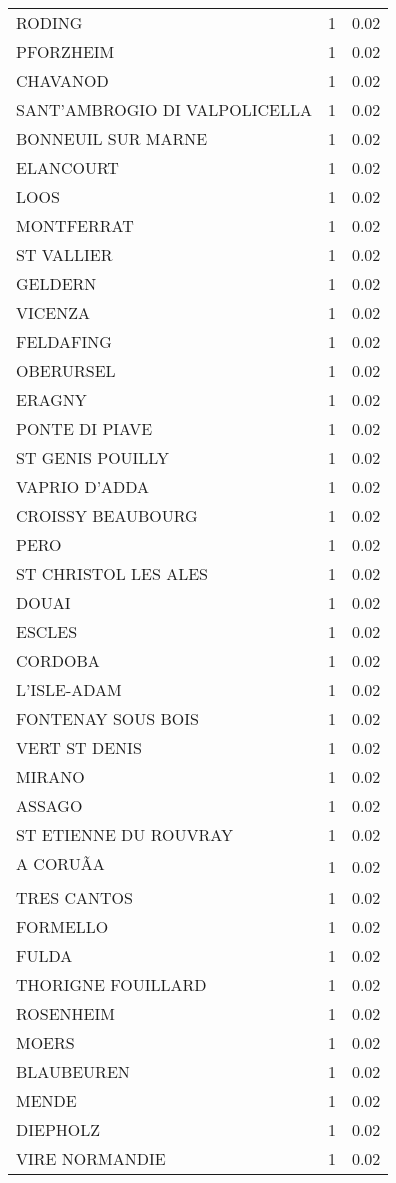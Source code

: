 \begin{table*}[htbp]
\begin{tabular}{lrr}
RODING & 1 & 0.02 \\
PFORZHEIM & 1 & 0.02 \\
CHAVANOD & 1 & 0.02 \\
SANT'AMBROGIO DI VALPOLICELLA & 1 & 0.02 \\
BONNEUIL SUR MARNE & 1 & 0.02 \\
ELANCOURT & 1 & 0.02 \\
LOOS & 1 & 0.02 \\
MONTFERRAT & 1 & 0.02 \\
ST VALLIER & 1 & 0.02 \\
GELDERN & 1 & 0.02 \\
VICENZA & 1 & 0.02 \\
FELDAFING & 1 & 0.02 \\
OBERURSEL & 1 & 0.02 \\
ERAGNY & 1 & 0.02 \\
PONTE DI PIAVE & 1 & 0.02 \\
ST GENIS POUILLY & 1 & 0.02 \\
VAPRIO D'ADDA & 1 & 0.02 \\
CROISSY BEAUBOURG & 1 & 0.02 \\
PERO & 1 & 0.02 \\
ST CHRISTOL LES ALES & 1 & 0.02 \\
DOUAI & 1 & 0.02 \\
ESCLES & 1 & 0.02 \\
CORDOBA & 1 & 0.02 \\
L'ISLE-ADAM & 1 & 0.02 \\
FONTENAY SOUS BOIS & 1 & 0.02 \\
VERT ST DENIS & 1 & 0.02 \\
MIRANO & 1 & 0.02 \\
ASSAGO & 1 & 0.02 \\
ST ETIENNE DU ROUVRAY & 1 & 0.02 \\
A CORUÃA & 1 & 0.02 \\
TRES CANTOS & 1 & 0.02 \\
FORMELLO & 1 & 0.02 \\
FULDA & 1 & 0.02 \\
THORIGNE FOUILLARD & 1 & 0.02 \\
ROSENHEIM & 1 & 0.02 \\
MOERS & 1 & 0.02 \\
BLAUBEUREN & 1 & 0.02 \\
MENDE & 1 & 0.02 \\
DIEPHOLZ & 1 & 0.02 \\
VIRE NORMANDIE & 1 & 0.02 \\

\end{tabular}
\end{table*}
